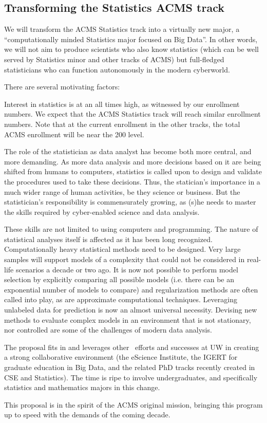 \subsection{Transforming the Statistics  ACMS track}
We will transform the ACMS Statistics track into a virtually new
major, a ``computationally minded Statistics major focused on Big Data''. 
In other words, we will not aim to produce scientists who also know statistics (which
can be well served by Statistics minor and other tracks of ACMS) but
full-fledged statisticians who can function autonomously in the modern
cyberworld.

There are several motivating factors:
\bit
\item Interest in statistics is at an all times high, as witnessed by
  our enrollment numbers. We expect that the ACMS Statistics track
  will reach similar enrollment numbers. Note that at the current
  enrollment in the other tracks, the total ACMS enrollment will be
  near the 200 level.

\item The role of
  the statistician as data analyst has become both more central, and
  more demanding. As more data analysis and more decisions based on it
  are being shifted from humans to computers, statistics is called
  upon to design and validate the procedures used to take these
  decisions. Thus, the statician's importance in a much wider range of
  human activities, be they science or business. But the
  statistician's responsibility is commensurately growing, as (s)he needs
  to master the skills required by cyber-enabled science and data
  analysis.
\item These skills are not limited to using computers and
  programming. The nature of statistical analyses itself is
  affected \cite{friedman:97} as it has been long
  recognized. Computationally heavy statistical methods need to be
  designed. Very large samples will support models of a complexity
  that could not be considered in real-life scenarios a decade or two
  ago. It is now not possible to perform model selection by explicitly
  comparing all possible models (i.e. there can be an exponential
  number of models to compare) and regularization methods are often
  called into play, as are approximate computational
  techniques. Leveraging unlabeled data for prediction is now an
  almost universal necessity. Devising new methods to evaluate complex
  models in an environment that is not stationary, nor controlled are
  some of the challenges of modern data analysis.
\item The proposal fits in and leverages other \cdse\ efforts and successes at UW in creating a strong collaborative environment (the eScience Institute, the IGERT for graduate education in Big Data, and the related PhD tracks recently created in CSE and Statistics). The time is ripe to involve undergraduates, and specifically statistics and mathematics majors in this change.
\item This proposal is in the spirit of the ACMS original mission,
  bringing this program up to speed with the demands of the coming decade.
\eit

